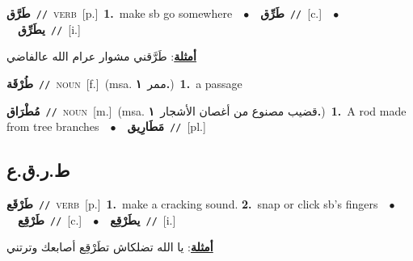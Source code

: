 \documentclass[10pt,a4paper,twoside]{article} %
\begin{document}
\begin{multicols}{2}
{\setlength\topsep{0pt}\textbf{\foreignlanguage{arabic}{طَرَّق}}\ {\color{gray}\texttt{//}\color{black}}\ \textsc{verb}\ [p.]\ \textbf{1.}~make sb go somewhere\ \ $\bullet$\ \ \setlength\topsep{0pt}\textbf{\foreignlanguage{arabic}{طَرِّق}}\ {\color{gray}\texttt{//}\color{black}}\ [c.]\ \ $\bullet$\ \ \setlength\topsep{0pt}\textbf{\foreignlanguage{arabic}{يطَرِّق}}\ {\color{gray}\texttt{//}\color{black}}\ [i.]\  \begin{flushright}\color{gray}\foreignlanguage{arabic}{\textbf{\underline{\foreignlanguage{arabic}{أمثلة}}}: طَرَّقني مشوار عرام الله عالفاضي}\end{flushright}\color{black}} \vspace{2mm}

{\setlength\topsep{0pt}\textbf{\foreignlanguage{arabic}{طُرْقَة}}\ {\color{gray}\texttt{//}\color{black}}\ \textsc{noun}\ [f.]\ \color{gray}(msa. \foreignlanguage{arabic}{ممر}~\foreignlanguage{arabic}{\textbf{١.}})\color{black}\ \textbf{1.}~a passage\ } \vspace{2mm}

{\setlength\topsep{0pt}\textbf{\foreignlanguage{arabic}{مُطْرَاق}}\ {\color{gray}\texttt{//}\color{black}}\ \textsc{noun}\ [m.]\ \color{gray}(msa. \foreignlanguage{arabic}{قضيب مصنوع من أغصان الأشجار}~\foreignlanguage{arabic}{\textbf{١.}})\color{black}\ \textbf{1.}~A rod made from tree branches\ \ $\bullet$\ \ \setlength\topsep{0pt}\textbf{\foreignlanguage{arabic}{مَطَارِيق}}\ {\color{gray}\texttt{//}\color{black}}\ [pl.]\ } \vspace{2mm}

\vspace{-3mm}
\subsection*{\color{blue}\foreignlanguage{arabic}{ط.ر.ق.ع}\color{blue}{}} 

{\setlength\topsep{0pt}\textbf{\foreignlanguage{arabic}{طَرْقَع}}\ {\color{gray}\texttt{//}\color{black}}\ \textsc{verb}\ [p.]\ \textbf{1.}~make a cracking sound.  \textbf{2.}~snap or click sb's fingers\ \ $\bullet$\ \ \setlength\topsep{0pt}\textbf{\foreignlanguage{arabic}{طَرْقِع}}\ {\color{gray}\texttt{//}\color{black}}\ [c.]\ \ $\bullet$\ \ \setlength\topsep{0pt}\textbf{\foreignlanguage{arabic}{يطَرْقِع}}\ {\color{gray}\texttt{//}\color{black}}\ [i.]\  \begin{flushright}\color{gray}\foreignlanguage{arabic}{\textbf{\underline{\foreignlanguage{arabic}{أمثلة}}}: يا الله تضلكاش تطَرْقِع أصابعك وترتني}\end{flushright}\color{black}} \vspace{2mm}


\end{multicols}
\end{document}
